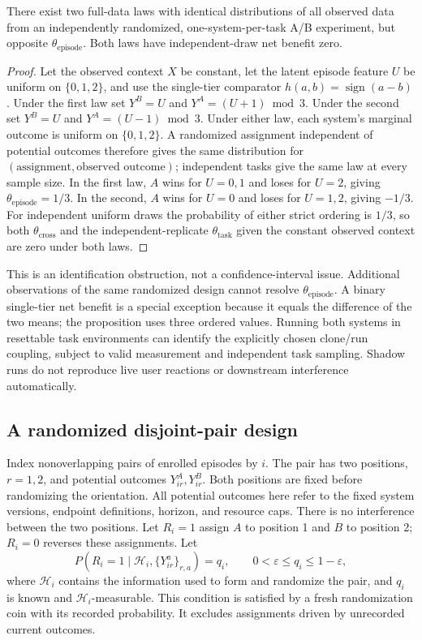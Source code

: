 \begin{proposition}
\label{prop:nonidentification}
There exist two full-data laws with identical distributions of all
observed data from an independently randomized, one-system-per-task
A/B experiment, but opposite $\theta_{\mathrm{episode}}$. Both laws have
independent-draw net benefit zero.
\end{proposition}
\begin{proof}
Let the observed context $X$ be constant, let the latent episode feature
$U$ be uniform on $\{0,1,2\}$, and use the single-tier comparator
$h(a,b)=\operatorname{sign}(a-b)$. Under the first law set
$Y^B=U$ and $Y^A=(U+1)\bmod3$. Under the second set
$Y^B=U$ and $Y^A=(U-1)\bmod3$. Under either law, each system's marginal
outcome is uniform on $\{0,1,2\}$. A randomized assignment independent of
potential outcomes therefore gives the same distribution for
$(\text{assignment},\text{observed outcome})$; independent tasks give the
same law at every sample size. In the first law, $A$ wins for $U=0,1$
and loses for $U=2$, giving $\theta_{\mathrm{episode}}=1/3$. In the second,
$A$ wins for $U=0$ and loses for $U=1,2$, giving $-1/3$.
For independent uniform draws the probability of either strict ordering
is $1/3$, so both $\theta_{\mathrm{cross}}$ and the independent-replicate
$\theta_{\mathrm{task}}$ given the constant observed context are zero
under both laws.
\end{proof}

This is an identification obstruction, not a confidence-interval issue.
Additional observations of the same randomized design cannot resolve
$\theta_{\mathrm{episode}}$.
A binary single-tier net benefit is a special exception because it
equals the difference of the two means; the proposition uses three
ordered values. Running both systems in resettable task environments can
identify the explicitly chosen clone/run coupling, subject to valid
measurement and independent task sampling. Shadow runs do not reproduce
live user reactions or downstream interference automatically.

\subsection{A randomized disjoint-pair design}

Index nonoverlapping pairs of enrolled episodes by $i$. The pair has two
positions, $r=1,2$, and potential outcomes $Y_{ir}^A,Y_{ir}^B$.
Both positions are fixed before randomizing the orientation. All
potential outcomes here refer to the fixed system versions, endpoint
definitions, horizon, and resource caps. There is no interference between
the two positions. Let $R_i=1$ assign $A$ to position 1 and $B$ to
position 2; $R_i=0$ reverses these assignments. Let
\[
 P(R_i=1\mid\mathcal H_i,\{Y_{ir}^a\}_{r,a})=q_i,
 \qquad 0<\varepsilon\leq q_i\leq1-\varepsilon,
\]
where $\mathcal H_i$ contains the information used to form and randomize
the pair, and $q_i$ is known and $\mathcal H_i$-measurable. This condition
is satisfied by a fresh randomization coin with its recorded probability.
It excludes assignments driven by unrecorded current outcomes.

